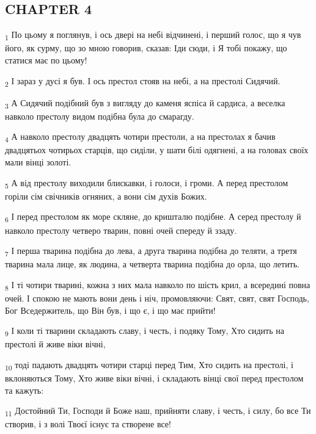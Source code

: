 \subsection{CHAPTER 4}
\begin{tcolorbox}
\textsubscript{1} По цьому я поглянув, і ось двері на небі відчинені, і перший голос, що я чув його, як сурму, що зо мною говорив, сказав: Іди сюди, і Я тобі покажу, що статися має по цьому!
\end{tcolorbox}
\begin{tcolorbox}
\textsubscript{2} І зараз у дусі я був. І ось престол стояв на небі, а на престолі Сидячий.
\end{tcolorbox}
\begin{tcolorbox}
\textsubscript{3} А Сидячий подібний був з вигляду до каменя яспіса й сардиса, а веселка навколо престолу видом подібна була до смарагду.
\end{tcolorbox}
\begin{tcolorbox}
\textsubscript{4} А навколо престолу двадцять чотири престоли, а на престолах я бачив двадцятьох чотирьох старців, що сиділи, у шати білі одягнені, а на головах своїх мали вінці золоті.
\end{tcolorbox}
\begin{tcolorbox}
\textsubscript{5} А від престолу виходили блискавки, і голоси, і громи. А перед престолом горіли сім свічників огняних, а вони сім духів Божих.
\end{tcolorbox}
\begin{tcolorbox}
\textsubscript{6} І перед престолом як море скляне, до кришталю подібне. А серед престолу й навколо престолу четверо тварин, повні очей спереду й ззаду.
\end{tcolorbox}
\begin{tcolorbox}
\textsubscript{7} І перша тварина подібна до лева, а друга тварина подібна до теляти, а третя тварина мала лице, як людина, а четверта тварина подібна до орла, що летить.
\end{tcolorbox}
\begin{tcolorbox}
\textsubscript{8} І ті чотири тварині, кожна з них мала навколо по шість крил, а всередині повна очей. І спокою не мають вони день і ніч, промовляючи: Свят, свят, свят Господь, Бог Вседержитель, що Він був, і що є, і що має прийти!
\end{tcolorbox}
\begin{tcolorbox}
\textsubscript{9} І коли ті тварини складають славу, і честь, і подяку Тому, Хто сидить на престолі й живе віки вічні,
\end{tcolorbox}
\begin{tcolorbox}
\textsubscript{10} тоді падають двадцять чотири старці перед Тим, Хто сидить на престолі, і вклоняються Тому, Хто живе віки вічні, і складають вінці свої перед престолом та кажуть:
\end{tcolorbox}
\begin{tcolorbox}
\textsubscript{11} Достойний Ти, Господи й Боже наш, прийняти славу, і честь, і силу, бо все Ти створив, і з волі Твоєї існує та створене все!
\end{tcolorbox}
